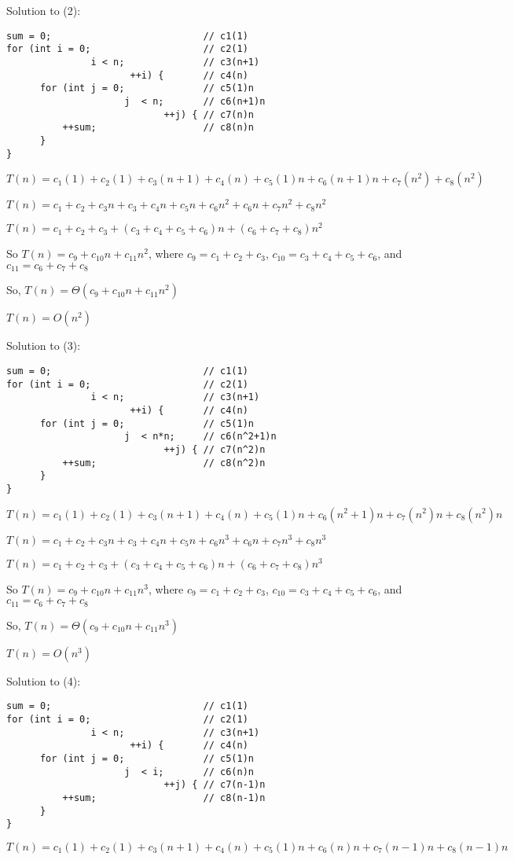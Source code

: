\documentclass[12pt]{article}
\begin{document}
\begin{enumerate}
Solution to (2):
\begin{verbatim}
sum = 0;                           // c1(1)
for (int i = 0;                    // c2(1)
               i < n;              // c3(n+1)
                      ++i) {       // c4(n)
      for (int j = 0;              // c5(1)n
                     j  < n;       // c6(n+1)n
                            ++j) { // c7(n)n
          ++sum;                   // c8(n)n
      }                  
}
\end{verbatim}
$T(n) = c_1(1)+c_2(1)+c_3(n+1)+c_4(n)+c_5(1)n +c_6(n+1)n+c_7(n^2)+c_8(n^2)$

$T(n) = c_1+c_2+c_3n+c_3+c_4n+c_5n +c_6n^2+c_6n+c_7n^2+c_8n^2$

$T(n) = c_1+c_2+c_3+(c_3+c_4+c_5+c_6)n+(c_6+c_7+c_8)n^2$

So $T(n) = c_9+c_{10}n+c_{11}n^2$, where $c_9 = c_1+c_2+c_3$, $c_{10} =  c_3+c_4+c_5+c_6$, and $ c_{11} = c_6+c_7+c_8$

So, $T(n) = \Theta(c_9+c_{10}n+c_{11}n^2)$

$T(n) = O(n^2)$


Solution to (3):
\begin{verbatim}
sum = 0;                           // c1(1)
for (int i = 0;                    // c2(1)
               i < n;              // c3(n+1)
                      ++i) {       // c4(n)
      for (int j = 0;              // c5(1)n
                     j  < n*n;     // c6(n^2+1)n
                            ++j) { // c7(n^2)n
          ++sum;                   // c8(n^2)n
      }                  
}
\end{verbatim}
$T(n) = c_1(1)+c_2(1)+c_3(n+1)+c_4(n)+c_5(1)n +c_6(n^2+1)n+c_7(n^2)n+c_8(n^2)n$

$T(n) = c_1 + c_2 + c_3n + c_3 + c_4n + c_5n + c_6n^3 + c_6n + c_7n^3 + c_8n^3$

$T(n) = c_1 + c_2 + c_3 + (c_3 + c_4 + c_5 + c_6)n + (c_6 + c_7+c_8)n^3 $

So $T(n) = c_9 + c_{10}n + c_{11}n^3$, where $c_9 = c_1 + c_2 + c_3$, $c_{10} = c_3 + c_4 + c_5 + c_6$, and $c_{11} = c_6 + c_7+c_8$

So, $T(n) = \Theta(c_9 + c_{10}n + c_{11}n^3)$

$T(n) = O(n^3)$


Solution to (4):
\begin{verbatim}
sum = 0;                           // c1(1)
for (int i = 0;                    // c2(1)
               i < n;              // c3(n+1)
                      ++i) {       // c4(n)
      for (int j = 0;              // c5(1)n
                     j  < i;       // c6(n)n
                            ++j) { // c7(n-1)n
          ++sum;                   // c8(n-1)n
      }                  
}
\end{verbatim}
$T(n) = c_1(1)+c_2(1)+c_3(n+1)+c_4(n)+c_5(1)n +c_6(n)n+c_7(n-1)n+c_8(n-1)n$


\end{enumerate}
\end{document}
